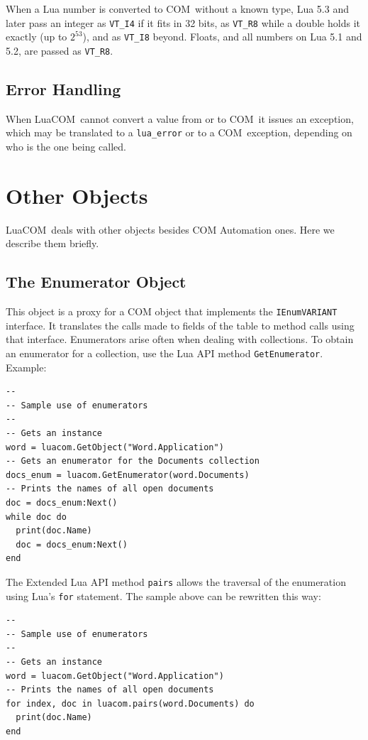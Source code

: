 \documentclass[11pt,a4paper,english]{report}
\newcommand{\ident}[1]{\mbox{\texttt{#1}}}
\newcommand{\techname}[1]{\mbox{#1}}
\newcommand{\com}{\techname{COM}}
\newcommand{\luacom}{\techname{LuaCOM}}
\begin{document}
When a Lua number is converted to \com\ without a known type, Lua 5.3
and later pass an integer as \verb+VT_I4+ if it fits in 32 bits, as
\verb+VT_R8+ while a double holds it exactly (up to $2^{53}$), and as
\verb+VT_I8+ beyond. Floats, and all numbers on Lua 5.1 and 5.2, are
passed as \verb+VT_R8+.

\subsection{Error Handling}
When \luacom\ cannot convert a value from or to \com\, it issues an
exception, which may be translated to a \verb+lua_error+ or to a \com\
exception, depending on who is the one being called.


\section{Other Objects}

\luacom\ deals with other objects besides COM Automation ones. Here we
describe them briefly.

\subsection{The Enumerator Object}
This object is a proxy for a COM object that implements the
\ident{IEnumVARIANT} interface. It translates the calls made to fields
of the table to method calls using that interface. Enumerators arise
often when dealing with collections. To obtain an enumerator for a
collection, use the Lua API method \ident{GetEnumerator}. Example:

\begin{verbatim}
--
-- Sample use of enumerators
--
-- Gets an instance
word = luacom.GetObject("Word.Application")
-- Gets an enumerator for the Documents collection
docs_enum = luacom.GetEnumerator(word.Documents)
-- Prints the names of all open documents
doc = docs_enum:Next()
while doc do
  print(doc.Name)
  doc = docs_enum:Next()
end
\end{verbatim}

The Extended Lua API method \ident{pairs} allows the traversal of the
enumeration using Lua's \ident{for} statement. The sample above can be
rewritten this way:

\begin{verbatim}
--
-- Sample use of enumerators
--
-- Gets an instance
word = luacom.GetObject("Word.Application")
-- Prints the names of all open documents
for index, doc in luacom.pairs(word.Documents) do
  print(doc.Name)
end
\end{verbatim}
\end{document}
